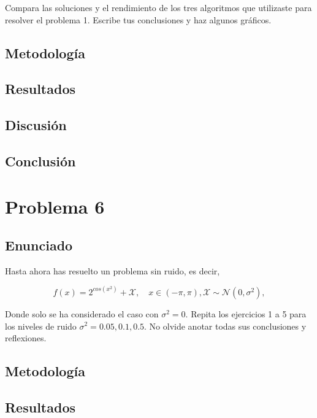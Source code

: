 \documentclass{article}
\begin{document}
Compara las soluciones y el rendimiento de los tres algoritmos que utilizaste para resolver el problema 1. Escribe tus conclusiones y haz algunos gráficos.

\subsection{Metodología}

\subsection{Resultados}
\setcounter{equation}{0}

\subsection{Discusión}

\subsection{Conclusión}

\section{Problema 6}

\subsection{Enunciado}

Hasta ahora has resuelto un problema sin ruido, es decir,

\begin{equation*}
    f(x)=2^{cos(x^2)}+\mathcal{X}, \quad x \in (-\pi,\pi), \mathcal{X} \sim \mathcal{N}(0,\sigma^{2}),
\end{equation*}

Donde solo se ha considerado el caso con $\sigma^2=0$. Repita los ejercicios 1 a 5 para los niveles de ruido $\sigma^2 = 0.05,0.1,0.5$. No olvide anotar todas sus conclusiones y reflexiones.

\subsection{Metodología}

\subsection{Resultados}
\setcounter{equation}{0}
\end{document}

